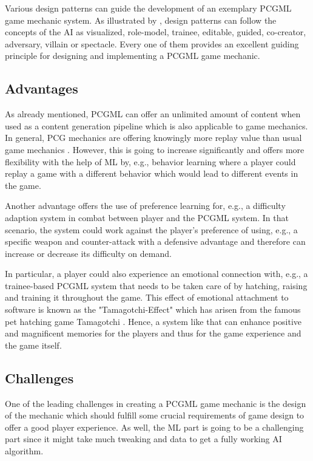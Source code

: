 \documentclass[MGS,Master,english]{twbook}%
\begin{document}
Various design patterns can guide the development of an exemplary \ac{PCGML} game mechanic system. As illustrated by \citep{ai::aiBasedGameDesignPattern}, design patterns can follow the concepts of the \ac{AI} as visualized, role-model, trainee, editable, guided, co-creator, adversary, villain or spectacle. Every one of them provides an excellent guiding principle for designing and implementing a \ac{PCGML} game mechanic.

\subsection{Advantages}
As already mentioned, \ac{PCGML} can offer an unlimited amount of content when used as a content generation pipeline which is also applicable to game mechanics. In general, \ac{PCG} mechanics are offering knowingly more replay value than usual game mechanics \cite{pcg::book}. However, this is going to increase significantly and offers more flexibility with the help of \ac{ML} by, e.g., behavior learning where a player could replay a game with a different behavior which would lead to different events in the game.

Another advantage offers the use of preference learning for, e.g., a difficulty adaption system in combat between player and the \ac{PCGML} system. In that scenario, the system could work against the player’s preference of using, e.g., a specific weapon and counter-attack with a defensive advantage and therefore can increase or decrease its difficulty on demand.

In particular, a player could also experience an emotional connection with, e.g., a trainee-based \ac{PCGML} system that needs to be taken care of by hatching, raising and training it throughout the game. This effect of emotional attachment to software is known as the "Tamagotchi-Effect" which has arisen from the famous pet hatching game Tamagotchi \cite{intro::tamagotchiEffect}. Hence, a system like that can enhance positive and magnificent memories for the players and thus for the game experience and the game itself.

\subsection{Challenges}
One of the leading challenges in creating a \ac{PCGML} game mechanic is the design of the mechanic which should fulfill some crucial requirements of game design to offer a good player experience. As well, the \ac{ML} part is going to be a challenging part since it might take much tweaking and data to get a fully working \ac{AI} algorithm.
\end{document}
